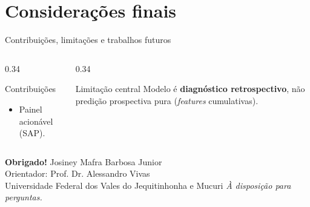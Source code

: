 \documentclass[aspectratio=169,11pt,brazil]{beamer}
\begin{document}
\section{Considerações finais}

\begin{frame}{Contribuições, limitações e trabalhos futuros}
  \begin{columns}[T]
    \begin{column}{0.34\textwidth}
      \begin{block}{Contribuições}
        \footnotesize
        \begin{itemize}
          \item Painel acionável (SAP).
        \end{itemize}
      \end{block}
    \end{column}
    \begin{column}{0.34\textwidth}
      \begin{block}{Limitação central}
        \footnotesize
        Modelo é \textbf{diagnóstico retrospectivo}, não predição prospectiva pura (\emph{features} cumulativas).
      \end{block}
    \end{column}
  \end{columns}
\end{frame}

\begin{frame}[plain]
  \centering
  \vfill
  {\Huge\color{ufvjmgreen}\textbf{Obrigado!}}
  \vfill
  {\large Josiney Mafra Barbosa Junior}\\[0.3em]
  {\normalsize Orientador: Prof. Dr. Alessandro Vivas}\\[0.3em]
  {\small Universidade Federal dos Vales do Jequitinhonha e Mucuri}
  \vfill
  {\normalsize\itshape À disposição para perguntas.}
  \vfill
\end{frame}
\end{document}
